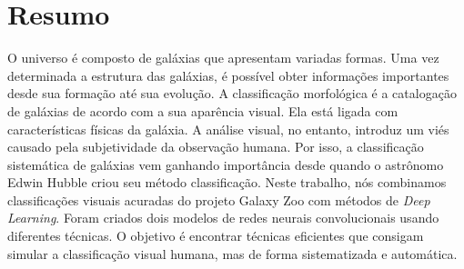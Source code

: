 \section*{Resumo}

O universo é composto de galáxias que apresentam variadas formas. Uma vez determinada a estrutura das galáxias, é possível obter informações importantes desde sua formação até sua evolução. A classificação morfológica é a catalogação de galáxias de acordo com a sua aparência visual. Ela está ligada com características físicas da galáxia. A análise visual, no entanto, introduz um viés causado pela subjetividade da observação humana. Por isso, a classificação sistemática de galáxias vem ganhando importância desde quando o astrônomo Edwin Hubble criou seu método classificação. Neste trabalho, nós combinamos classificações visuais acuradas do projeto Galaxy Zoo com métodos de \emph{Deep Learning}. Foram criados dois modelos de redes neurais convolucionais usando diferentes técnicas. O objetivo é encontrar técnicas eficientes que consigam simular a classificação visual humana, mas de forma sistematizada e automática.